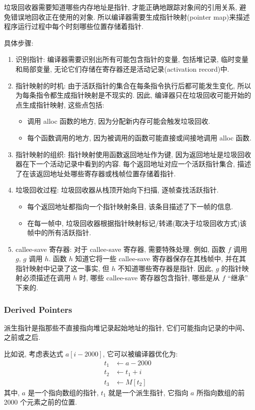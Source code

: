 垃圾回收器需要知道哪些内存地址是指针, 才能正确地跟踪对象间的引用关系, 避免错误地回收正在使用的对象. 所以编译器需要生成指针映射(pointer map)来描述程序运行过程中每个时刻哪些位置存储着指针. 

具体步骤:
\begin{enumerate}
    \item 识别指针: 编译器需要识别出所有可能包含指针的变量, 包括堆记录, 临时变量和局部变量, 无论它们存储在寄存器还是活动记录(activation record)中. 
    \item 指针映射的时机: 由于活跃指针的集合在每条指令执行后都可能发生变化, 所以为每条指令都生成指针映射是不现实的. 因此, 编译器只在垃圾回收可能开始的点生成指针映射, 这些点包括:
    \begin{itemize}
        \item 调用 alloc 函数的地方, 因为分配新内存可能会触发垃圾回收. 
        \item 每个函数调用的地方, 因为被调用的函数可能直接或间接地调用 alloc 函数. 
    \end{itemize}
    \item 指针映射的组织: 指针映射使用函数返回地址作为键, 因为返回地址是垃圾回收器在下一个活动记录中看到的内容. 每个返回地址对应一个活跃指针集合, 描述了在该返回地址处哪些寄存器或栈帧位置存储着指针. 
    \item 垃圾回收过程: 垃圾回收器从栈顶开始向下扫描, 逐帧查找活跃指针. 
    \begin{itemize}
        \item 每个返回地址都指向一个指针映射条目, 该条目描述了下一帧的信息. 
        \item 在每一帧中, 垃圾回收器根据指针映射标记/转递(取决于垃圾回收方式)该帧中的所有活跃指针. 
    \end{itemize}
    \item callee-save 寄存器: 对于 callee-save 寄存器, 需要特殊处理. 
    \subitem 例如, 函数 $f$ 调用 $g$, $g$ 调用 $h$. 函数 $h$ 知道它将一些 callee-save 寄存器保存在其栈帧中, 并在其指针映射中记录了这一事实, 但 $h$ 不知道哪些寄存器是指针. 因此, $g$ 的指针映射必须描述在调用 $h$ 时, 哪些 callee-save 寄存器包含指针, 哪些是从 $f$ ``继承'' 下来的.
\end{enumerate}

\subsubsection{Derived Pointers}
派生指针是指那些不直接指向堆记录起始地址的指针, 它们可能指向记录的中间、之前或之后. 

比如说, 考虑表达式 $a[i-2000]$, 它可以被编译器优化为: 
\begin{align*}
    t_1 &\leftarrow a - 2000\\
    t_2 &\leftarrow t_1 + i \\
    t_3 &\leftarrow M[t_2]
\end{align*}
其中, $a$ 是一个指向数组的指针, $t_1$ 就是一个派生指针, 它指向 $a$ 所指向数组的前 2000 个元素之前的位置. 

